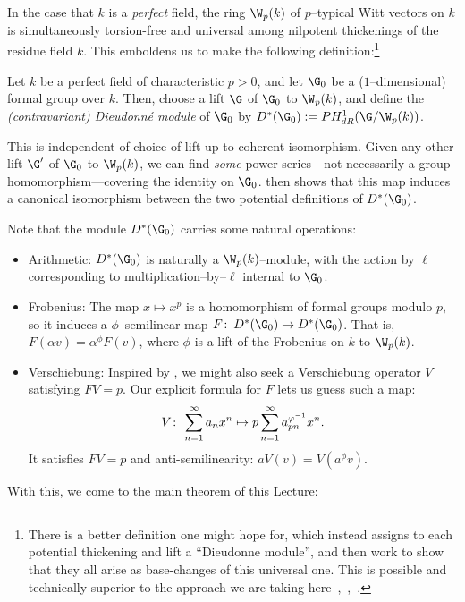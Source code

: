 In the case that $k$ is a \emph{perfect} field, the ring $\W_p(k)$ of $p$--typical Witt vectors on $k$ is simultaneously torsion-free and universal among nilpotent thickenings of the residue field $k$.  This emboldens us to make the following definition:\footnote{There is a better definition one might hope for, which instead assigns to each potential thickening and lift a ``Dieudonne module'', and then work to show that they all arise as base-changes of this universal one.  This is possible and technically superior to the approach we are taking here~\cite[Theorem 5.1.6]{Katz},~\cite[Chapter 4]{Messing},~\cite{Grothendieck}.}

\begin{definition}{\cite[Section 5.5]{Katz}}
Let $k$ be a perfect field of characteristic $p > 0$, and let $\G_0$ be a ($1$--dimensional) formal group over $k$.  Then, choose a lift $\G$ of $\G_0$ to $\W_p(k)$, and define the \textit{(contravariant) Dieudonn\'e module} of $\G_0$ by $D^*(\G_0) := PH^1_{dR}(\G / \W_p(k))$.
\end{definition}

\begin{remark}
This is independent of choice of lift up to coherent isomorphism.  Given any other lift $\G'$ of $\G_0$ to $\W_p(k)$, we can find \emph{some} power series---not necessarily a group homomorphism---covering the identity on $\G_0$.   then shows that this map induces a canonical isomorphism between the two potential definitions of $D^*(\G_0)$.
\end{remark}

Note that the module $D^*(\G_0)$ carries some natural operations:
\begin{itemize}
\item Arithmetic: $D^*(\G_0)$ is naturally a $\W_p(k)$--module, with the action by $\ell$ corresponding to multiplication--by--$\ell$ internal to $\G_0$.
\item Frobenius: The map $x \mapsto x^p$ is a homomorphism of formal groups modulo $p$, so it induces a $\phi$--semilinear map $F\co D^*(\G_0) \to D^*(\G_0)$.  That is, $F(\alpha v) = \alpha^\phi F(v)$, where $\phi$ is a lift of the Frobenius on $k$ to $\W_p(k)$.
\item Verschiebung: Inspired by , we might also seek a Verschiebung operator $V$ satisfying $FV = p$.  Our explicit formula for $F$ lets us guess such a map: \[V\colon\thinspace \sum_{n=1}^\infty a_n x^n \mapsto p \sum_{n=1}^\infty a_{pn}^{\varphi^{-1}} x^n.\]  It satisfies $FV = p$ and anti-semilinearity: $aV(v) = V(a^\phi v)$.
\end{itemize}
With this, we come to the main theorem of this Lecture:

